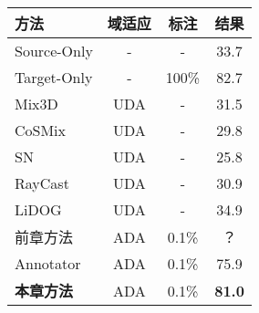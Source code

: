\begin{table}[H]
	\renewcommand{\arraystretch}{1}
    \centering
    \setlength{\tabcolsep}{12mm}
    \label{tab:4-3}
    \wuhao
    \begin{tabular}{lccc}
        \toprule[1.5pt]
        \textbf{方法} & \textbf{域适应} & \textbf{标注} & \textbf{结果} \\
        \midrule
        Source-Only   & -       & -           & 33.7 \\
        Target-Only   & -       & 100\%           & 82.7 \\
        Mix3D         & UDA     & -   & 31.5 \\
        CoSMix        & UDA     & -   & 29.8 \\
        SN              & UDA   & -     & 25.8 \\
        RayCast        & UDA    & -    & 30.9 \\
        LiDOG        & UDA      & -       & 34.9 \\
        前章方法       & ADA    & 0.1\%      & ？ \\
        Annotator     & ADA     & 0.1\%     & 75.9 \\
        \textbf{本章方法}       & ADA    & 0.1\%      & \textbf{81.0} \\
        \bottomrule[1.5pt]
    \end{tabular}
\end{table}